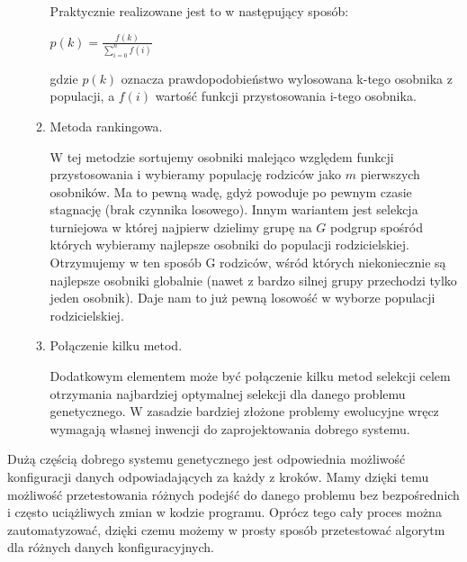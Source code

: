 \begin{par}
\begin{enumerate}
\begin{par}
\begin{enumerate}
\begin{par}
					Praktycznie realizowane jest to w następujący sposób:
					\begin{center}
						$p(k)=\frac{f(k)}{\displaystyle\sum\limits_{i=0}^n f(i)}$
					\end{center}
					gdzie $p(k)$ oznacza prawdopodobieństwo wylosowana k-tego osobnika z populacji, a $f(i)$ wartość funkcji przystosowania i-tego osobnika.
				\end{par}
			\item Metoda rankingowa.
				\begin{par}
					W tej metodzie sortujemy osobniki malejąco względem funkcji przystosowania i wybieramy populację rodziców jako $m$ pierwszych osobników. 
					Ma to pewną wadę, gdyż powoduje po pewnym czasie stagnację (brak czynnika losowego). 
					Innym wariantem jest selekcja turniejowa w której najpierw dzielimy grupę na $G$ podgrup spośród których wybieramy najlepsze osobniki do populacji rodzicielskiej. 
					Otrzymujemy w ten sposób G rodziców, wśród których niekoniecznie są najlepsze osobniki globalnie (nawet z bardzo silnej grupy przechodzi tylko jeden osobnik). 
					Daje nam to już pewną losowość w wyborze populacji rodzicielskiej.
				\end{par}
			\item Połączenie kilku metod.
				\begin{par}
					Dodatkowym elementem może być połączenie kilku metod selekcji celem otrzymania najbardziej optymalnej selekcji dla danego problemu genetycznego. 
					W zasadzie bardziej złożone problemy ewolucyjne wręcz wymagają własnej inwencji do zaprojektowania dobrego systemu.
				\end{par}
		\end{enumerate}
	\end{par}
\end{enumerate}
	Dużą częścią dobrego systemu genetycznego jest odpowiednia możliwość konfiguracji danych odpowiadających za każdy z kroków.
	Mamy dzięki temu możliwość przetestowania różnych podejść do danego problemu bez bezpośrednich i często uciążliwych zmian w kodzie programu.
	Oprócz tego cały proces można zautomatyzować, dzięki czemu możemy w prosty sposób przetestować algorytm dla różnych danych konfiguracyjnych.
\end{par}
